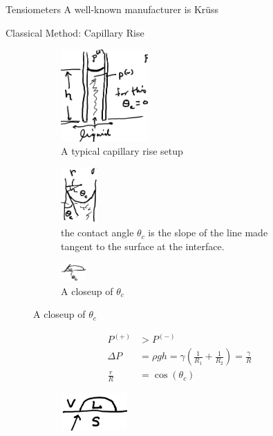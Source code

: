 \documentclass{article}
\begin{document}
\begin{section}{Tensiometers}
	A well-known manufacturer is Kr\"uss

	\begin{subsection}{Classical Method: Capillary Rise}

		\begin{figure}[h]
			\centering
			\begin{subfigure}[t]{0.3\textwidth}
			\centering
				\includegraphics[height=100pt]{capillaryRise1}
						\caption{A typical capillary rise setup}
			\end{subfigure}
			\begin{subfigure}[t]{0.3\textwidth}
			\centering
				\includegraphics[height=60pt]{capillaryRise2}
						\caption{the contact angle $\theta_c$ is the slope of the line made tangent to the surface at the interface.}
			\end{subfigure}
			\begin{subfigure}[t]{0.3\textwidth}
			\centering
				\includegraphics[height=20pt]{capillaryRise3}
						\caption{A closeup of $\theta_c$}
			\end{subfigure}
								\label{fig:capillary}
		\end{figure}
	\begin{align*}
		P^{(+)}&>P^{(-)}\\
		\Delta P &= \rho g h = \gamma \left(\frac{1}{R_1}+\frac{1}{R_2}\right) = \frac{\gamma}{R}\\
		\frac{r}{R} &= \cos{(\theta_c)}
	\end{align*}
	\begin{figure}[b]
		\centering
		\begin{subfigure}[t]{0.3\textwidth}
			\includegraphics[height=40pt]{3phasecontactside}

\end{subfigure}
\end{figure}
\end{subsection}
\end{section}
\end{document}
